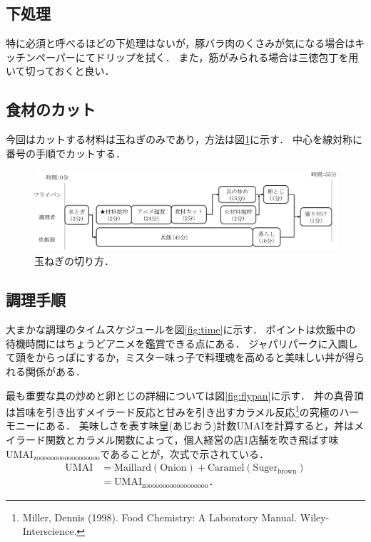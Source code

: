 \subsection{下処理}\label{ux4e0bux51e6ux7406}

特に必須と呼べるほどの下処理はないが，豚バラ肉のくさみが気になる場合はキッチンペーパーにてドリップを拭く．
また，筋がみられる場合は三徳包丁を用いて切っておくと良い．

\subsection{食材のカット}\label{ux98dfux6750ux306eux30abux30c3ux30c8}

今回はカットする材料は玉ねぎのみであり，方法は図\ref{fig:onion}に示す．
中心を線対称に番号の手順でカットする．


\begin{figure}[ht]
\centering
\includegraphics[page=3, height=3.00000cm]{./fig/fig_bb.pdf}
\caption{玉ねぎの切り方．\label{fig:onion}}
\end{figure}

\subsection{調理手順}\label{ux8abfux7406ux624bux9806}

大まかな調理のタイムスケジュールを図\ref{fig:time}に示す．
ポイントは炊飯中の待機時間にはちょうどアニメを鑑賞できる点にある．
ジャパリパークに入園して頭をからっぽにするか，ミスター味っ子で料理魂を高めると美味しい丼が得られる関係がある．

最も重要な具の炒めと卵とじの詳細については図\ref{fig:flypan}に示す．
丼の真骨頂は旨味を引き出すメイラード反応と甘みを引き出すカラメル反応\footnote{Miller, Dennis (1998). Food Chemistry: A Laboratory Manual. Wiley-Interscience.}の究極のハーモニーにある．
美味しさを表す味皇(あじおう)計数\(\mathrm{UMAI}\)を計算すると，丼はメイラード関数とカラメル関数によって，個人経営の店1店舗を吹き飛ばす味\(\mathrm{UMAI_{zoooooooooooooooooo}}\)であることが，次式で示されている．
\begin{align}
 \mathrm{UMAI} &= \mathrm{Maillard}(\mathrm{Onion}) + \mathrm{Caramel}(\mathrm{Suger_{brown}})\\
&= \mathrm{UMAI_{zoooooooooooooooooo}}．
\end{align}

